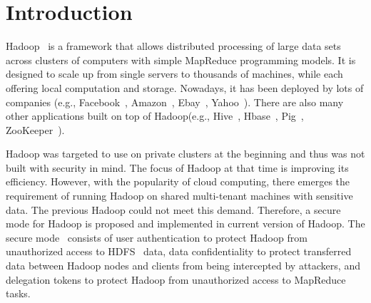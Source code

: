 \section{Introduction}
\label{intro}

Hadoop~\cite{hadoop} is a framework that allows distributed processing of large data sets across clusters of computers with simple MapReduce programming models. It is designed to scale up from single servers to thousands of machines, while each offering local computation and storage. Nowadays, it has been deployed by lots of companies (e.g., Facebook~\cite{facebook}, Amazon~\cite{amazon}, Ebay~\cite{ebay}, Yahoo~\cite{yahoo}). There are also many other applications built on top of Hadoop(e.g., Hive~\cite{thusoo2009hive,hive}, Hbase~\cite{hbase}, Pig~\cite{pig}, ZooKeeper~\cite{zookeeper}).

Hadoop was targeted to use on private clusters at the beginning and thus was not built with security in mind. The focus of Hadoop at that time is improving its efficiency. However, with the popularity of cloud computing, there emerges the requirement of running Hadoop on shared multi-tenant machines with sensitive data. The previous Hadoop could not meet this demand. Therefore, a secure mode for Hadoop is proposed and implemented in current version of Hadoop. The secure mode~\cite{securemode} consists of user authentication to protect Hadoop from unauthorized access to HDFS~\cite{shvachko2010hadoop} data, data confidentiality to protect transferred data between Hadoop nodes and clients from being intercepted by attackers, and delegation tokens to protect Hadoop from unauthorized access to MapReduce tasks.

